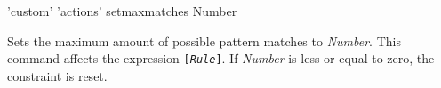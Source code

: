 \begin{rail}
  'custom' 'actions' setmaxmatches Number
\end{rail}
Sets the maximum amount of possible pattern matches to \emph{Number}. This command affects the expression \texttt{[\emph{Rule}]}. If \emph{Number} is less or equal to zero, the constraint is reset.


